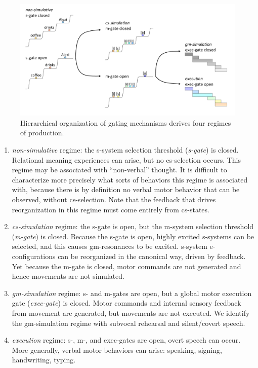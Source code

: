   
\begin{figure}
\includegraphics[width=\textwidth]{figures/Tilsen-img56.png}
\caption{Hierarchical organization of gating mechanisms derives four regimes of production.}
\label{fig:4:6}
\end{figure}
 
\begin{enumerate}
\item \textit{non-simulative} regime: the s-system selection threshold (\textit{s-gate}) is closed. Relational meaning experiences can arise, but no cs-selection occurs. This regime may be associated with “non-verbal” thought. It is difficult to characterize more precisely what sorts of behaviors this regime is associated with, because there is by definition no verbal motor behavior that can be observed, without cs-selection. Note that the feedback that drives reorganization in this regime must come entirely from cs-states.

\item \textit{cs-simulation} regime: the s-gate is open, but the m-system selection threshold (\textit{m-gate}) is closed. Because the s-gate is open, highly excited s-systems can be selected, and this causes gm-resonances to be excited. s-system e-configurations can be reorganized in the canonical way, driven by feedback. Yet because the m-gate is closed, motor commands are not generated and hence movements are not simulated. 

\item \textit{gm-simulation} regime: s- and m-gates are open,  but a global motor execution gate (\textit{exec-gate}) is closed. Motor commands and internal sensory feedback from movement are generated, but movements are not executed. We identify the gm-simulation regime with subvocal rehearsal and silent/covert speech. 

\item \textit{execution} regime: s-, m-, and exec-gates are open, overt speech can occur. More generally, verbal motor behaviors can arise: speaking, signing, handwriting, typing.
\end{enumerate}

